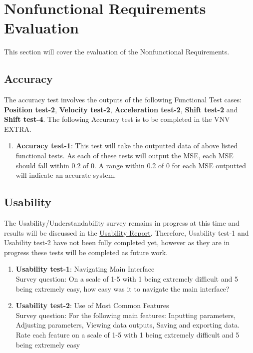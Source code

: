 \documentclass[12pt, titlepage]{article}
\begin{document}
\section{Nonfunctional Requirements Evaluation}

This section will cover the evaluation of the Nonfunctional Requirements. 

\subsection{Accuracy}

The accuracy test involves the outputs of the following Functional Test cases: \textbf{Position test-2}, \textbf{Velocity test-2}, \textbf{Acceleration test-2}, \textbf{Shift test-2} and \textbf{Shift test-4}. 
The following Accuracy test is to be completed in the VNV EXTRA. 

\begin{enumerate}
  \item{\textbf{Accuracy test-1}:}
  This test will take the outputted data of above listed functional tests. 
  As each of these tests will output the MSE, each MSE should fall within 0.2 of 0.
  A range within 0.2 of 0 for each MSE outputted will indicate an accurate system. 
  
\end{enumerate}

		
\subsection{Usability}
The Usability/Understandability survey remains in progress at this time and results will be discussed in the \href{file:../UsabilityReport/UsabilityReport.pdf}{Usability Report}. 
Therefore, Usability test-1 and Usability test-2 have not been fully completed yet, however as they are in progress these tests will be completed as future work. 

\begin{enumerate}
\item{\textbf{Usability test-1}: Navigating Main Interface}\\
Survey question: On a scale of 1-5 with 1 being extremely difficult and 5 being extremely easy, how easy was it to navigate the main interface? 
\item{\textbf{Usability test-2}: Use of Most Common Features}\\
Survey question: For the following main features: Inputting parameters, Adjusting parameters, Viewing data outputs, Saving and exporting data. 
Rate each feature on a scale of 1-5 with 1 being extremely difficult and 5 being extremely easy
\end{enumerate}
\end{document}
